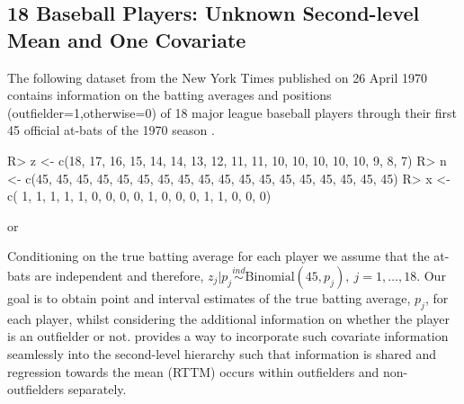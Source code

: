 \documentclass[article]{jss}
\begin{document}
\subsection[Unknown Second-level Mean and One Covariate]{18 Baseball Players: Unknown Second-level Mean and One Covariate} 

The following dataset from the New York Times published on 26 April 1970 contains information on the batting averages and positions (outfielder=1,otherwise=0) of 18 major league baseball players through their first 45 official at-bats of the 1970 season \citep{1975}.

\begin{CodeChunk}
\begin{CodeInput}
R> z <- c(18, 17, 16, 15, 14, 14, 13, 12, 11, 11, 10, 10, 10, 10, 10,  9,  8,  7)
R> n <- c(45, 45, 45, 45, 45, 45, 45, 45, 45, 45, 45, 45, 45, 45, 45, 45, 45, 45)
R> x <- c( 1,  1,  1,  1,  1,  0,  0,  0,  0,  1,  0,  0,  0,  1,  1,  0,  0,  0) 
\end{CodeInput}
\end{CodeChunk}
or
\begin{CodeChunk}
\end{CodeChunk}
Conditioning on the true batting average for each player we assume that the at-bats are independent and therefore, $z_{j}\vert p_{j} \textrm{Binomial}(45, p_{j}), ~j=1, \ldots, 18$. Our goal is to obtain point and interval estimates of the true batting average, $p_{j}$, for each player, whilst considering the additional information on whether the player is an outfielder or not.  provides a way to incorporate such covariate information seamlessly into the second-level hierarchy such that information is shared and regression towards the mean (RTTM) occurs within outfielders and non-outfielders separately. %
\end{document}
